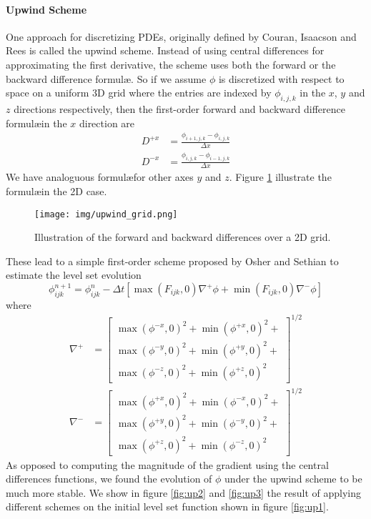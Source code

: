 \documentclass{article}
\begin{document}
\paragraph{Upwind Scheme}
One approach for discretizing PDEs, originally defined by Couran, Isaacson and
Rees \cite{courant1952solution} is called the upwind scheme. Instead of using
central differences for approximating the first derivative, the scheme uses
both the forward or the backward difference formul\ae. So if we assume $\phi$
is discretized with respect to space on a uniform 3D grid where the entries
are indexed by $\phi_{i,j,k}$ in the $x$, $y$ and $z$ directions respectively,
then the first-order forward and backward difference formul\ae in the $x$
direction are
\begin{align}
  D^{+x} &= \frac{\phi_{i+1,j,k} - \phi_{i,j,k}}{\Delta x} \\
  D^{-x} &= \frac{\phi_{i,j,k} - \phi_{i-1,j,k}}{\Delta x}
\end{align}
We have analoguous formul\ae for other axes $y$ and $z$. Figure
\ref{fig:fbd} illustrate the formul\ae in the 2D case.
\begin{figure}
  \centering
  \texttt{[image: img/upwind\_grid.png]}
  \caption{Illustration of the forward and backward differences over a 2D grid.}    
  \label{fig:fbd}
\end{figure}
These lead to a simple first-order scheme proposed by Osher and Sethian to
estimate the level set evolution
\[
\phi^{n+1}_{ijk} = \phi^{n}_{ijk} - \Delta t [ \max(F_{ijk}, 0)  \nabla^{+}\phi
  + \min(F_{ijk},0) \nabla^{-}\phi  ]
\]
where
\begin{align}
  \nabla^{+} & = 
    \begin{bmatrix}
        \max(\phi^{-x}, 0)^2 + \min(\phi^{+x}, 0)^2 + \\
        \max(\phi^{-y}, 0)^2 + \min(\phi^{+y}, 0)^2 + \\
        \max(\phi^{-z}, 0)^2 + \min(\phi^{+z}, 0)^2
    \end{bmatrix}^{1/2}  \\
    \nabla^{-} & = 
    \begin{bmatrix}
        \max(\phi^{+x}, 0)^2 + \min(\phi^{-x}, 0)^2 + \\
        \max(\phi^{+y}, 0)^2 + \min(\phi^{-y}, 0)^2 + \\
        \max(\phi^{+z}, 0)^2 + \min(\phi^{-z}, 0)^2
    \end{bmatrix}^{1/2} 
\end{align}
As opposed to computing the magnitude of the gradient using the central
differences functions, we found the evolution of $\phi$ under the upwind
scheme to be much more stable. We show in figure \ref{fig:up2} and
\ref{fig:up3} the result of applying different schemes on the initial level set
function shown in figure \ref{fig:up1}.
\end{document}
